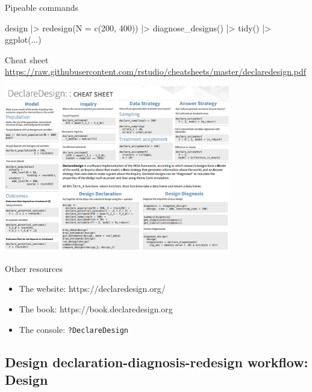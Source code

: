 \documentclass[
  11pt,
  ignorenonframetext,
]{beamer}
\newenvironment{Shaded}{\begin{snugshade}}{\end{snugshade}}
\newcommand{\AttributeTok}[1]{\textcolor[rgb]{0.40,0.45,0.13}{#1}}
\newcommand{\DecValTok}[1]{\textcolor[rgb]{0.68,0.00,0.00}{#1}}
\newcommand{\FunctionTok}[1]{\textcolor[rgb]{0.28,0.35,0.67}{#1}}
\newcommand{\NormalTok}[1]{\textcolor[rgb]{0.00,0.23,0.31}{#1}}
\newcommand{\SpecialCharTok}[1]{\textcolor[rgb]{0.37,0.37,0.37}{#1}}
\providecommand{\tightlist}{%
  \setlength{\itemsep}{0pt}\setlength{\parskip}{0pt}}\usepackage{longtable,booktabs,array}
\begin{document}
\begin{frame}[fragile]{Pipeable commands}
\protect\hypertarget{pipeable-commands}{}
\begin{Shaded}
\begin{Highlighting}[]
\NormalTok{design }\SpecialCharTok{|\textgreater{}} 
  \FunctionTok{redesign}\NormalTok{(}\AttributeTok{N =} \FunctionTok{c}\NormalTok{(}\DecValTok{200}\NormalTok{, }\DecValTok{400}\NormalTok{)) }\SpecialCharTok{|\textgreater{}}
  \FunctionTok{diagnose\_designs}\NormalTok{() }\SpecialCharTok{|\textgreater{}} 
  \FunctionTok{tidy}\NormalTok{() }\SpecialCharTok{|\textgreater{}} 
  \FunctionTok{ggplot}\NormalTok{(...) }
\end{Highlighting}
\end{Shaded}
\end{frame}

\begin{frame}{Cheat sheet}
\protect\hypertarget{cheat-sheet}{}
\url{https://raw.githubusercontent.com/rstudio/cheatsheets/master/declaredesign.pdf}

\includegraphics[width=3.87in,height=\textheight]{assets/cheat_sheet.png}
\end{frame}

\begin{frame}[fragile]{Other resources}
\protect\hypertarget{other-resources}{}
\begin{itemize}
\tightlist
\item
  The website: https://declaredesign.org/
\item
  The book: https://book.declaredesign.org
\item
  The console: \texttt{?DeclareDesign}
\end{itemize}
\end{frame}

\hypertarget{design-declaration-diagnosis-redesign-workflow-design}{%
\subsection{Design declaration-diagnosis-redesign workflow:
Design}\label{design-declaration-diagnosis-redesign-workflow-design}}
\end{document}

